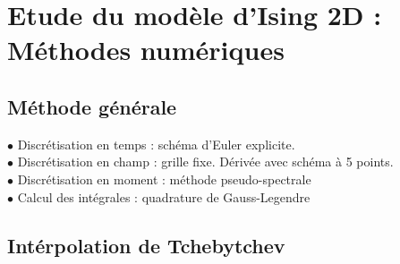 \documentclass[9pt]{beamer}
\begin{document}
	\section{Etude du modèle d'Ising 2D : Méthodes numériques}
	\subsection{Méthode générale}
	
	\sommaire{}
	
	\begin{frame}
	\justifying
	\vspace*{22pt}

	$\bullet$ Discrétisation en temps : schéma d'Euler explicite.\\
	$\bullet$ Discrétisation en champ : grille fixe. Dérivée avec schéma à 5 points. \\
	$\bullet$ Discrétisation en moment : méthode pseudo-spectrale \\
	$\bullet$ Calcul des intégrales : quadrature de Gauss-Legendre \\
	\vspace*{11pt}
	
	\end{frame}
	
	\subsection{Intérpolation de Tchebytchev}
	
\end{document}
